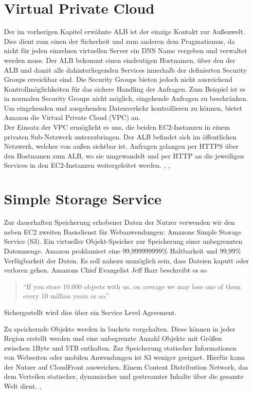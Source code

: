 \section{Virtual Private Cloud}
\label{sec:vpc}
Der im vorherigen Kapitel erwähnte ALB ist der einzige Kontakt zur Außenwelt. Dies dient zum einen der Sicherheit und zum anderen dem Pragmatismus, da nicht für jeden einzelnen virtuellen Server ein DNS Name vergeben und verwaltet werden muss. Der ALB bekommt einen eindeutigen Hostnamen, über den der ALB und damit alle dahinterliegenden Services innerhalb der definierten Security Groups erreichbar sind. Die Security Groups bieten jedoch nicht ausreichend Kontrollmöglichkeiten für das sichere Handling der Anfragen. Zum Beispiel ist es in normalen Security Groups nicht möglich, eingehende Anfragen zu beschränken. Um eingehenden und ausgehenden Datenverkehr kontrollieren zu können, bietet Amazon die Virtual Private Cloud (VPC) an. \\
Der Einsatz der VPC ermöglicht es uns, die beiden EC2-Instanzen in einem privaten Sub-Netzwerk unterzubringen. Der ALB befindet sich im öffentlichen Netzwerk, welches von außen sichtbar ist. Anfragen gelangen per HTTPS über den Hostnamen zum ALB, wo sie umgewandelt und per HTTP an die jeweiligen Services in den EC2-Instanzen weitergeleitet werden.
\cite{vliet:resilience}, \cite{wittig:awsinaction}, \cite{aws:vpc}

\section{Simple Storage Service}
\label{sec:s3}
Zur dauerhaften Speicherung erhobener Daten der Nutzer verwenden wir den neben EC2 zweiten Basisdienst für Webanwendungen: Amazons Simple Storage Service (S3). Ein virtueller Objekt-Speicher zur Speicherung einer unbegrenzten Datenmenge. Amazon proklamiert eine 99,999999999\% Haltbarkeit und 99,99\% Verfügbarkeit der Daten. Es soll nahezu unmöglich sein, dass Dateien kaputt oder verloren gehen. Amazons Chief Evangelist Jeff Barr beschreibt es so \\
\begin{quote}
"`If you store 10.000 objects with us, on average we may lose one of them every 10 million years or so."'
\end{quote} \cite{vliet:programmingec2}

Sichergestellt wird dies über ein Service Level Agreement. \cite{vliet:programmingec2}

Zu speichernde Objekte werden in buckets vorgehalten. Diese können in jeder Region erstellt werden und eine unbegrenzte Anzahl Objekte mit Größen zwischen 1Byte und 5TB enthalten. Zur Speicherung statischer Informationen von Webseiten oder mobilen Anwendungen ist S3 weniger geeignet. Hierfür kann der Nutzer auf CloudFront ausweichen. Einem Content Distribution Network, das dem Verteilen statischer, dynamischer und gestreamter Inhalte über die gesamte Welt dient.
\cite{vliet:resilience}, \cite{aws:s3}

